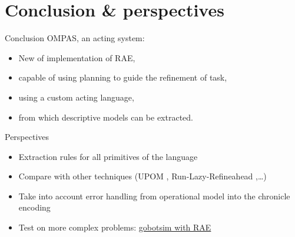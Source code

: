 \section{Conclusion \& perspectives}
\begin{frame}[c]{Conclusion}
    OMPAS, an acting system:
    \pause
        \begin{itemize}
            \item New of implementation of RAE,
            \item capable of using planning to guide the refinement of task,
            \item using a custom acting language,
            \item from which descriptive models can be extracted.
        \end{itemize}    
\end{frame}

\begin{frame}[c]{Perspectives}
    \begin{itemize}
        \item Extraction rules for all primitives of the language
        \pause
        \item Compare with other techniques (UPOM \cite{patraIntegratingActingPlanning2020}, Run-Lazy-Refineahead \cite{bansod2021integrating},\dots)
        \pause
        \item Take into account error handling from operational model into the chronicle encoding
        \pause
        \item Test on more complex problems: \href{https://youtu.be/KqBnKKIjug4}{gobotsim with RAE}
    \end{itemize}
\end{frame}

